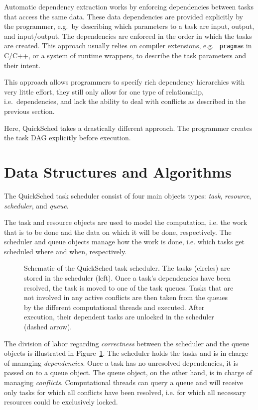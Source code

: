 \documentclass[preprint]{elsarticle}
\newcommand{\fig}[1]
    {Figure~\ref{fig:#1}}
\begin{document}
Automatic dependency extraction works by enforcing dependencies
between tasks that access the same data.
These data dependencies are provided explicitly by the programmer, e.g.~by
describing which parameters to a task are input, output, and input/output.
The dependencies are enforced in the order in which the tasks are 
created.
This approach usually relies on compiler extensions, e.g.~ {\tt pragma}s
in C/C++, or a system of runtime wrappers, to describe the task parameters
and their intent.

This approach allows programmers to specify rich dependency hierarchies
with very little effort, they still only allow for one type of relationship,
i.e.~dependencies, and lack the ability to deal with conflicts as
described in the previous section.

Here, QuickSched takes a drastically different approach.
The programmer creates the task DAG explicitly before execution.


\section{Data Structures and Algorithms}

The QuickSched task scheduler consist of four main
objects types: {\em task}, {\em resource}, {\em scheduler},
and {\em queue}.

The task and resource objects are used
to model the computation, i.e. the work that is to be done
and the data on which it will be done, respectively.
The scheduler and queue objects manage
how the work is done, i.e. which tasks get scheduled
where and when, respectively.

\begin{figure}
    \centerline{}
    \caption{Schematic of the QuickSched task scheduler.
        The tasks (circles) are stored in the scheduler (left).
        Once a task's dependencies have been resolved, the task
        is moved to one of the task queues.
        Tasks that are not involved in any active conflicts
        are then taken from the queues by the different
        computational threads and executed.
        After execution, their dependent tasks are unlocked
        in the scheduler (dashed arrow).}
    \label{fig:QSched}
\end{figure}

The division of labor regarding {\em correctness}
between the scheduler and
the queue objects is illustrated in \fig{QSched}.
The scheduler holds the tasks and is in charge
of managing {\em dependencies}.
Once a task has no unresolved dependencies, it is passed
on to a queue object.
The queue object, on the other hand, is in charge
of managing {\em conflicts}.
Computational threads can query a queue and will
receive only tasks for which all conflicts have been
resolved, i.e. for which all necessary resources could be 
exclusively locked.
\end{document}
